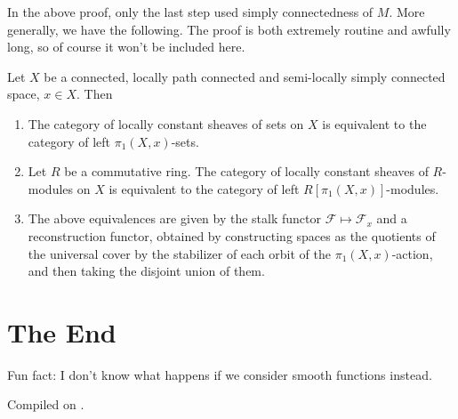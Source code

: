 \documentclass{article}
\begin{document}
\begin{remark}
    In the above proof, only the last step used simply connectedness of $M$. More generally, we have the following. The proof is both extremely routine and awfully long, so of course it won't be included here.
\end{remark}

\begin{theorem}
    Let $X$ be a connected, locally path connected and semi-locally simply connected space, $x\in X$. Then 
    \begin{enumerate}[label=(\roman*)]
        \item The category of locally constant sheaves of sets on $X$ is equivalent to the category of left $\pi_1(X,x)$-sets.
        \item Let $R$ be a commutative ring. The category of locally constant sheaves of $R$-modules on $X$ is equivalent to the category of left $R[\pi_1(X,x)]$-modules.
        \item The above equivalences are given by the stalk functor $\mathcal{F}\mapsto\mathcal{F}_x$ and a reconstruction functor, obtained by constructing \etale spaces as the quotients of the universal cover by the stabilizer of each orbit of the $\pi_1(X,x)$-action, and then taking the disjoint union of them.
    \end{enumerate}
\end{theorem}

\section*{The End}

Fun fact: I don't know what happens if we consider smooth functions instead.

\hfill

\noindent Compiled on \todayymd.

\noindent\home
\end{document}
